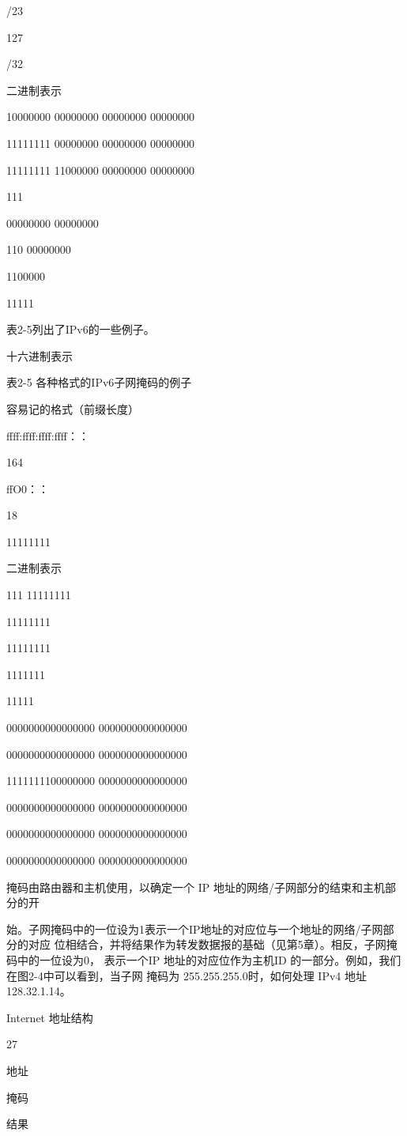 /23

127

/32

二进制表示

10000000 00000000 00000000 00000000

11111111 00000000 00000000 00000000

11111111 11000000 00000000 00000000

111

00000000 00000000

110 00000000

1100000

11111

表2-5列出了IPv6的一些例子。

十六进制表示

表2-5 各种格式的IPv6子网掩码的例子

容易记的格式（前缀长度）

ffff:ffff:ffff:ffff：：

164

ffO0：：

18

11111111

二进制表示

111 11111111

11111111

11111111

1111111

11111

0000000000000000 0000000000000000

0000000000000000 0000000000000000

1111111100000000 0000000000000000

0000000000000000 0000000000000000

0000000000000000 0000000000000000

0000000000000000 0000000000000000

掩码由路由器和主机使用，以确定一个 IP 地址的网络/子网部分的结束和主机部分的开

始。子网掩码中的一位设为1表示一个IP地址的对应位与一个地址的网络/子网部分的对应
位相结合，并将结果作为转发数据报的基础（见第5章）。相反，子网掩码中的一位设为0，
表示一个IP 地址的对应位作为主机ID 的一部分。例如，我们在图2-4中可以看到，当子网
掩码为 255.255.255.0时，如何处理 IPv4 地址 128.32.1.14。

Internet 地址结构

27

地址

掩码

结果

